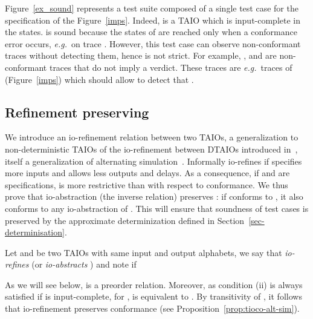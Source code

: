 \documentclass{LMCS}
\theoremstyle{plain}\newtheorem{proposition}[thm]{Proposition}
\def\eg{{\em e.g.}}
\begin{document}
\begin{exa}
Figure~\ref{ex_sound} represents a test suite composed of a single test case  for the specification  of the Figure~\ref{imps}. Indeed,  is a TAIO which is input-complete in the  states.
 is sound because
the  states of  are reached only when a conformance error occurs,
\eg~on trace . 
However, this test case can observe non-conformant traces without detecting them, hence  is not strict. For example, ,  and  are non-conformant traces that do not imply a   verdict. 
These traces are \eg~traces of  (Figure~\ref{imps}) which should allow
to detect that .
\end{exa}

\subsection{Refinement preserving \tioco}
We introduce an io-refinement relation between two TAIOs, a
generalization to non-deterministic TAIOs of the 
io-refinement  between DTAIOs introduced
in~\cite{David-Larsen-etal-HSCC10}, itself a generalization of
alternating simulation~\cite{Alur-Henzinger-Kupferman-Vardi-CONCUR98}.
Informally  io-refines  if  specifies more inputs and allows 
less outputs and delays.
As a consequence,  if  and  are specifications,
 is more restrictive than  with respect to conformance.
We thus prove that io-abstraction (the inverse relation) preserves \tioco:
if  conforms to , it also conforms to any io-abstraction
 of .  This will  ensure that  soundness of test cases is
preserved by the approximate determinization defined in Section~\ref{sec-determinisation}.


\begin{defi}
  Let  and  be two TAIOs with same input and output alphabets,
  we say that  {\em io-refines}  (or  {\em io-abstracts}
  ) and note  if

\end{defi}

As we will see below,  is a preorder relation.  
Moreover, as condition (ii)
is always satisfied if  is input-complete, for ,  is equivalent to .
By transitivity of , it follows that io-refinement preserves
conformance (see Proposition~\ref{prop:tioco-alt-sim}).
\end{document}
